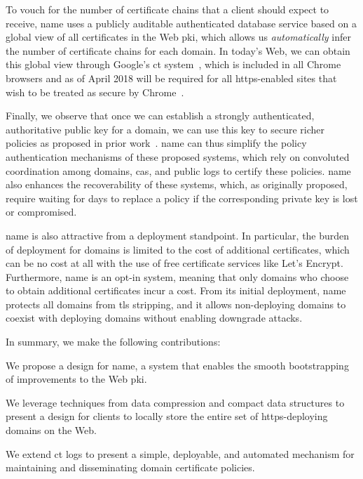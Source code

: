 To vouch for the number of certificate
chains that a client should expect to receive, 
\ac{name} uses a publicly auditable
authenticated database service based on a global view of all certificates in the
Web \ac{pki}, which allows us \emph{automatically} infer the number of
certificate chains for each domain. In today's Web, we can obtain this global
view through Google's \ac{ct} system~\cite{rfc6962}, which is included in all
Chrome browsers and as of April 2018 will be required for all \ac{https}-enabled
sites that wish to be treated as secure by Chrome~\cite{citation-needed}.

Finally, we observe that once we can establish a strongly authenticated,
authoritative public key for a domain, we can use this key to secure richer
policies as proposed in prior work~\cite{basin2014arpki,
szalachowski2014policert}. \ac{name} can thus simplify the policy authentication
mechanisms of these proposed systems, which rely on convoluted coordination
among domains, \acp{ca}, and public logs to certify these policies. \ac{name}
also enhances the recoverability of these systems, which, as originally proposed,
require waiting for days to replace a policy if the corresponding private key is
lost or compromised.

\ac{name} is also attractive from a deployment standpoint. In particular, the
burden of deployment for domains is limited to the cost of additional
certificates, which can be no cost at all with the use of free certificate services
like Let's Encrypt. Furthermore,
\ac{name} is an opt-in system, meaning that only domains who choose to obtain
additional certificates incur a cost. 
From its initial deployment, \ac{name} protects all domains from
\ac{tls} stripping, and
it allows non-deploying domains to coexist with deploying domains without enabling
downgrade attacks.

In summary, we make the following contributions:
\begin{compactitem}
\item We propose a design for \ac{name}, a system that enables the smooth
  bootstrapping of improvements to the Web \ac{pki}.
\item We leverage techniques from data compression and compact data structures
  to present a design for clients to locally store the entire set of
  \ac{https}-deploying domains on the Web.
\item We extend \ac{ct} logs to present a simple, deployable, and automated
  mechanism for maintaining and disseminating domain certificate policies.
\end{compactitem}


